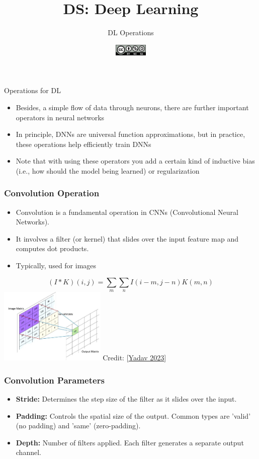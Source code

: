 \documentclass[aspectratio=169]{../latex_main/tntbeamer}  %
\title[DL: DL Operations]{DS: Deep Learning}
\subtitle{DL Operations}
\date{\hspace{0.5em} {\includegraphics[height=1.5em]{../latex_main/figures/Cc-by-nc-sa_icon.svg.png}}}
\begin{document}
	
	\maketitle

    \begin{frame}{Operations for DL}
        \begin{itemize}
            \item Besides, a simple flow of data through neurons, there are further important operators in neural networks
            \item In principle, DNNs are universal function approximations, but in practice, these operations help efficiently train DNNs
            \item Note that with using these operators you add a certain kind of inductive bias (i.e., how should the model being learned) or regularization 
        \end{itemize}
    \end{frame}
 
    \begin{frame}
    \frametitle{Convolution Operation}
    \begin{itemize}
        \item Convolution is a fundamental operation in CNNs (Convolutional Neural Networks).
        \item It involves a filter (or kernel) that slides over the input feature map and computes dot products.
        \item Typically, used for images
    \end{itemize}
    \begin{equation}
        (I * K)(i,j) = \sum_{m}\sum_{n} I(i-m,j-n)K(m,n)
    \end{equation}
        \centering
            \includegraphics[width=0.38\textwidth]{figure/convolution.jpg}
        Credit: [\href{https://www.linkedin.com/pulse/image-processing-convolution-filters-calculation-gradients-yadav/}{Yadav 2023}]
    \end{frame}
    
    \begin{frame}
    \frametitle{Convolution Parameters}
    \begin{itemize}
        \item \textbf{Stride:} Determines the step size of the filter as it slides over the input.
        \item \textbf{Padding:} Controls the spatial size of the output. Common types are 'valid' (no padding) and 'same' (zero-padding).
        \item \textbf{Depth:} Number of filters applied. Each filter generates a separate output channel.
    \end{itemize}
    \end{frame}
\end{document}
